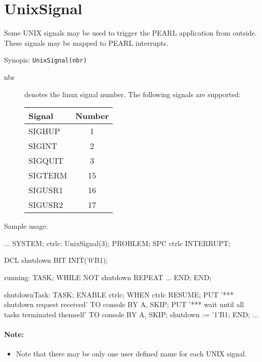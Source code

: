 
\section{UnixSignal}
Some UNIX signals may be used to trigger the PEARL application from outside.
These signals may be mapped to PEARL interrupts.

Synopis: \verb|UnixSignal(nbr)|

\begin{description}
\item [nbr] denotes the linux signal number.
The following signals are supported:

\begin{tabular}{|l|c|}
\hline
Signal & Number \\
\hline
SIGHUP & 1 \\
SIGINT & 2 \\
SIGQUIT & 3 \\
SIGTERM & 15 \\
SIGUSR1 & 16 \\
SIGUSR2 & 17 \\
\hline
\end{tabular}
\end{description}

Sample usage:
\begin{PEARLCode}
...
SYSTEM;
  ctrlc: UnixSignal(3);
PROBLEM;
   SPC ctrlc INTERRUPT;

   DCL shutdown BIT INIT('0'B1);

running: TASK;
   WHILE NOT shutdown REPEAT
      ...
   END;
END;

shutdownTask: TASK;
   ENABLE ctrlc;
   WHEN ctrlc RESUME;
   PUT '*** shutdown request received' TO console BY A, SKIP;
   PUT '*** wait until all tasks terminated themself' TO console BY A, SKIP;
   shutdown := '1'B1;
END;
...
\end{PEARLCode}

\paragraph{Note:}
\begin{itemize}
\item Note that there may be only one user defined name for each UNIX signal.
\end{itemize}

